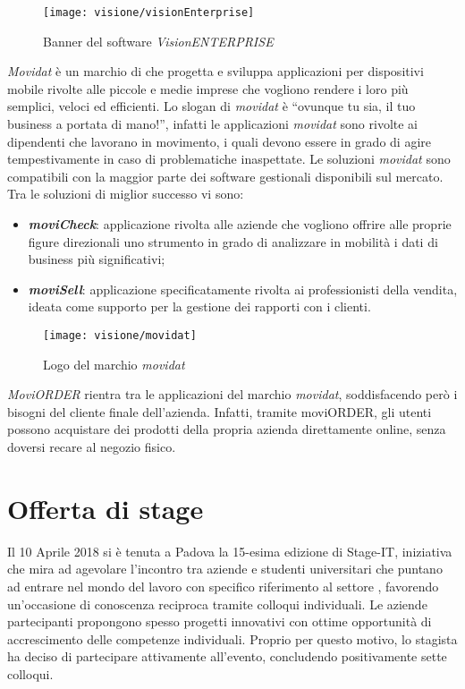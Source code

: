 \begin{figure}[!h] 
    \centering 
    \texttt{[image: visione/visionEnterprise]} 
    \caption{Banner del software \textit{VisionENTERPRISE}}
\end{figure}

\textit{Movidat} è un marchio di \visione{} che progetta e sviluppa applicazioni per dispositivi mobile rivolte alle piccole e medie imprese che vogliono rendere i loro  più semplici, veloci ed efficienti. Lo slogan di \textit{movidat} è ``ovunque tu sia, il tuo business a portata di mano!'', infatti le applicazioni \textit{movidat} sono rivolte ai dipendenti che lavorano in movimento, i quali devono essere in grado di agire tempestivamente in caso di problematiche inaspettate. Le soluzioni \textit{movidat} sono compatibili con la maggior parte dei software gestionali disponibili sul mercato. Tra le soluzioni di miglior successo vi sono:
\begin{itemize}
	\item \textbf{\textit{moviCheck}}: applicazione rivolta alle aziende che vogliono offrire alle proprie figure direzionali uno strumento in grado di analizzare in mobilità i dati di business più significativi;
	\item \textbf{\textit{moviSell}}: applicazione specificatamente rivolta ai professionisti della vendita, ideata come supporto per la gestione dei rapporti con i clienti.
\end{itemize}

\begin{figure}[!h] 
    \centering 
    \texttt{[image: visione/movidat]} 
    \caption{Logo del marchio \textit{movidat}}
\end{figure}

\textit{MoviORDER} rientra tra le applicazioni del marchio \textit{movidat}, soddisfacendo però i bisogni del cliente finale dell'azienda. Infatti, tramite moviORDER, gli utenti possono acquistare dei prodotti della propria azienda direttamente online, senza doversi recare al negozio fisico.

\section{Offerta di stage}

Il 10 Aprile 2018 si è tenuta a Padova la 15-esima edizione di Stage-IT, iniziativa che mira ad agevolare l'incontro tra aziende e studenti universitari che puntano ad entrare nel mondo del lavoro con specifico riferimento al settore , favorendo un'occasione di conoscenza reciproca tramite colloqui individuali. Le aziende partecipanti propongono spesso progetti innovativi con ottime opportunità di accrescimento delle competenze individuali. Proprio per questo motivo, lo stagista ha deciso di partecipare attivamente all'evento, concludendo positivamente sette colloqui. 

